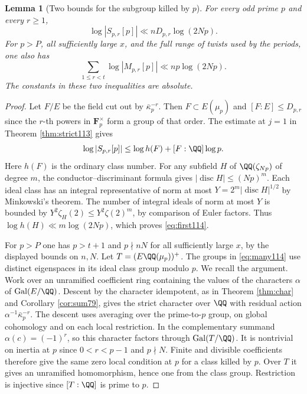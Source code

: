 \documentclass[a4paper,11pt]{article}
\newtheorem{lemma}[proposition]{Lemma}
\theoremstyle{definition}
\theoremstyle{remark}
\numberwithin{equation}{section}
\begin{document}
\begin{lemma}[Two bounds for the subgroup killed by \(p\)]
\label{lem:rank114}
For every odd prime \(p\) and every \(r\ge1\),
\begin{equation}
    \log |S_{p,r}[p]|
      \ll nD_{p,r}\log(2Np).                              \label{eq:first114}
\end{equation}
For \(p>P\), all sufficiently large \(x\), and the full range of
twists used by the periods, one also has
\begin{equation}
    \sum_{1\le r<t}\log |M_{p,r}[p]|
      \ll np\log(2Np).                                    \label{eq:many114}
\end{equation}
The constants in these two inequalities are absolute.
\end{lemma}
\begin{proof}
Let \(F/E\) be the field cut out by \(\bar\kappa_p^{-r}\).
Then \(F\subset E(\mu_p)\) and \([F:E]\le D_{p,r}\) since the
\(r\)-th powers in \(\mathbf F_p^\times\) form a group of that
order. The estimate at \(j=1\) in
Theorem \ref{thm:strict113}
gives
\[
    \log |S_{p,r}[p]|\le\log h(F)+[F:\QQ]\log p .
\]
Here \(h(F)\) is the ordinary class number. For any subfield
\(H\) of \(\QQ(\zeta_{Np})\) of degree \(m\), the
conductor--discriminant formula gives
\(|\operatorname{disc} H|\le(Np)^m\). Each ideal class has an
integral representative of norm at most
\(Y=2^m|\operatorname{disc}H|^{1/2}\) by Minkowski's theorem.
The number of integral ideals of norm at most \(Y\) is bounded
by \(Y^2\zeta_H(2)\le Y^2\zeta(2)^m\), by comparison of Euler
factors. Thus \(\log h(H)\ll m\log(2Np)\), which proves
\eqref{eq:first114}.

For \(p>P\) one has \(p>t+1\) and \(p\nmid nN\) for all
sufficiently large \(x\), by the displayed bounds on \(n,N\).
Let \(T=(E\QQ(\mu_p))^+\). The groups in \eqref{eq:many114}
use distinct eigenspaces in its ideal class group modulo \(p\).
We recall the argument. Work over an unramified coefficient ring
containing the values of the characters \(\alpha\) of
\(\operatorname{Gal}(E/\QQ)\). Descent by the character
idempotent, as in
Theorem \ref{thm:char} and Corollary \ref{cor:sum79}, gives the strict character over \(\QQ\)
with residual action \(\alpha^{-1}\bar\kappa_p^{-r}\).
The descent uses averaging over the prime-to-\(p\) group, on
global cohomology and on each local restriction. In the
complementary summand \(\alpha(c)=(-1)^r\), so this character
factors through \(\operatorname{Gal}(T/\QQ)\). It is nontrivial
on inertia at \(p\) since \(0<r<p-1\) and \(p\nmid N\). Finite
and divisible coefficients therefore give the same zero local
condition at \(p\) for a class killed by \(p\). Over \(T\) it
gives an unramified homomorphism, hence one from the class group.
Restriction is injective since \([T:\QQ]\) is prime to \(p\).


\end{proof}
\end{document}
